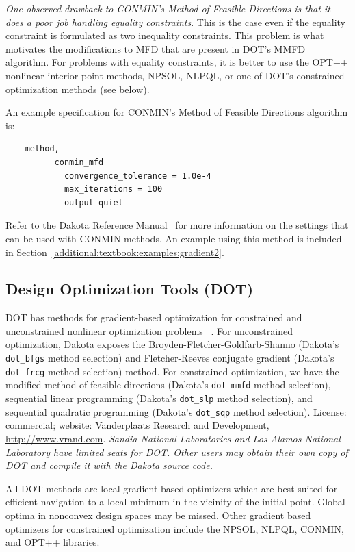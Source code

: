 \emph{One observed drawback to CONMIN's Method of Feasible Directions
is that it does a poor job handling equality constraints}. This is the
case even if the equality constraint is formulated as two inequality
constraints. This problem is what motivates the modifications to MFD
that are present in DOT's MMFD algorithm. For problems with equality
constraints, it is better to use the OPT++ nonlinear interior point
methods, NPSOL, NLPQL, or one of DOT's constrained optimization
methods (see below).

An example specification for CONMIN's Method of Feasible Directions
algorithm is:
\begin{small}
\begin{verbatim}
    method,
          conmin_mfd
            convergence_tolerance = 1.0e-4
            max_iterations = 100
            output quiet
\end{verbatim}
\end{small}

Refer to the Dakota Reference Manual~\cite{RefMan} for more information on
the settings that can be used with CONMIN methods. An example using this method
is included in Section~\ref{additional:textbook:examples:gradient2}.

\subsection{Design Optimization Tools (DOT)}\label{opt:software:dot}

DOT has methods for gradient-based optimization for constrained and
unconstrained nonlinear optimization problems ~\cite{Van95}. For
unconstrained optimization, Dakota exposes the
Broyden-Fletcher-Goldfarb-Shanno (Dakota's \texttt{dot\_bfgs} method
selection) and Fletcher-Reeves conjugate gradient (Dakota's
\texttt{dot\_frcg} method selection) method. For constrained
optimization, we have the modified method of feasible directions
(Dakota's \texttt{dot\_mmfd} method selection), sequential linear
programming (Dakota's \texttt{dot\_slp} method selection), and
sequential quadratic programming (Dakota's \texttt{dot\_sqp} method
selection). License: commercial; website: Vanderplaats Research and
Development, \url{http://www.vrand.com}. {\em Sandia National
  Laboratories and Los Alamos National Laboratory have limited seats
  for DOT. Other users may obtain their own copy of DOT and compile it
  with the Dakota source code.}

All DOT methods are local gradient-based optimizers which are best
suited for efficient navigation to a local minimum in the vicinity of
the initial point. Global optima in nonconvex design spaces may be
missed. Other gradient based optimizers for constrained optimization
include the NPSOL, NLPQL, CONMIN, and OPT++ libraries.

